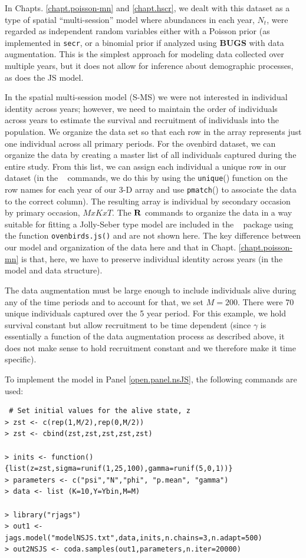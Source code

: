 In Chapts. \ref{chapt.poisson-mn} and \ref{chapt.hscr}, we dealt with this dataset as a type
of  spatial ``multi-session''
model where abundances in each year, $N_{t}$, were regarded as
independent random variables either with a Poisson prior (as
implemented in \mbox{\tt secr}, or a binomial prior if analyzed using
{\bf BUGS} with data augmentation.
This 
is the simplest approach for modeling data
collected over multiple years, but it does not allow for inference
about demographic processes, as does the JS model.

In the spatial multi-session
model (S-MS) we were not
interested in individual identity across years; however, we need to maintain the order of individuals across years
to estimate the survival and recruitment of individuals into the population.
We organize the data set so that each row in the
array represents just one individual across all primary periods.
For the ovenbird dataset, we
can organize the data by creating a master list of all individuals
captured during the entire study.  From this list, we can assign each
individual a unique row in our dataset (in the \R~ commands,
we do this by using the \mbox{\tt unique}() function
on the row names
for each year of our 3-D array and use \mbox{\tt pmatch}()
to associate the data to the correct column).  The resulting array is individual by 
secondary occasion by primary occasion, $M x K x T$.
The ${\bf R}$ commands
to organize the data in a way suitable for fitting a Jolly-Seber type
model 
are included in the \scrbook~ package using the function \verb+ovenbirds.js()+ and are not
shown here.
The key difference between our model and organization of the data here and that 
in
Chapt. \ref{chapt.poisson-mn} is that, here, we have to preserve
individual identity across years (in the model and data structure). 

The data
augmentation must be large enough to include individuals alive during
any of the time periods and to account for that, we set $M=200$.  There 
were 70 unique individuals captured over the 5 year period.
For this example,
we hold survival constant but allow recruitment to be time dependent
(since $\gamma$ is essentially a function of the data augmentation
process as described above, it does not make sense to hold recruitment constant and we
therefore make it time specific).

To implement the model in Panel \ref{open.panel.nsJS}, the following commands
are used:

{\small
\begin{verbatim}
 # Set initial values for the alive state, z
> zst <- c(rep(1,M/2),rep(0,M/2))
> zst <- cbind(zst,zst,zst,zst,zst)

> inits <- function(){list(z=zst,sigma=runif(1,25,100),gamma=runif(5,0,1))}
> parameters <- c("psi","N","phi", "p.mean", "gamma")
> data <- list (K=10,Y=Ybin,M=M)

> library("rjags")
> out1 <- jags.model("modelNSJS.txt",data,inits,n.chains=3,n.adapt=500)
> out2NSJS <- coda.samples(out1,parameters,n.iter=20000)
\end{verbatim}
}

